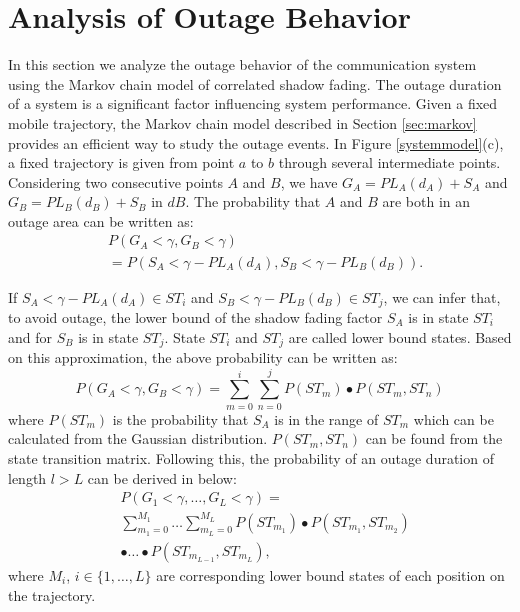 \section{Analysis of Outage Behavior}
\label{sec:outage}
In this section we analyze the outage behavior of the communication system using the Markov chain model of correlated shadow fading. The outage duration of a system is a significant factor influencing system performance. Given a fixed mobile trajectory, the Markov chain model described in Section \ref{sec:markov} provides an efficient way to study the outage events. In Figure \ref{systemmodel}(c), a fixed trajectory is given from point $a$ to $b$ through several intermediate points. Considering two consecutive points $A$ and $B$, we have $G_{A}=PL_{A}(d_{A})+S_{A}$ and $G_{B}=PL_{B}(d_{B})+S_{B}$ in $dB$. The probability that $A$ and $B$ are both in an outage area can be written as:
\begin{equation}
\begin{split}
&P(G_{A}<\gamma, G_{B}<\gamma) \\
&= P(S_{A}<\gamma-PL_{A}(d_{A}), S_{B}<\gamma-PL_{B}(d_{B})).
\end{split}
\end{equation}

If $S_{A}<\gamma-PL_{A}(d_{A}) \in ST_{i}$ and $S_{B}<\gamma-PL_{B}(d_{B}) \in ST_{j}$, we can infer that, to avoid outage, the lower bound of the shadow fading factor $S_{A}$ is in state $ST_{i}$ and for $S_{B}$ is in state $ST_{j}$. State $ST_{i}$ and $ST_{j}$ are called lower bound states. Based on this approximation, the above probability can be written as:
\begin{equation}
P(G_{A}<\gamma, G_{B}<\gamma)=\sum_{m=0}^{i}\sum_{n=0}^{j} P(ST_{m})\bullet P(ST_{m},ST_{n})
\end{equation}
where $P(ST_{m})$ is the probability that $S_{A}$ is in the range of $ST_{m}$ which can be calculated from the Gaussian distribution. $P(ST_{m},ST_{n})$ can be found from the state transition matrix. Following this, the probability of an outage duration of length $l>L$ can be derived in below:
\begin{equation}
\begin{split}
&P(G_{1}<\gamma,\dots,G_{L}<\gamma)=\\
&\sum_{m_{1}=0}^{M_{1}}\dots\sum_{m_{L}=0}^{M_{L}} P(ST_{m_{1}})\bullet P(ST_{m_{1}},ST_{m_{2}})\\
&\bullet\dots\bullet P(ST_{m_{L-1}},ST_{m_{L}}),
\end{split}
\end{equation}
where $M_{i}$, $i\in\{1,\dots,L\}$ are corresponding lower bound states of each position on the trajectory.


